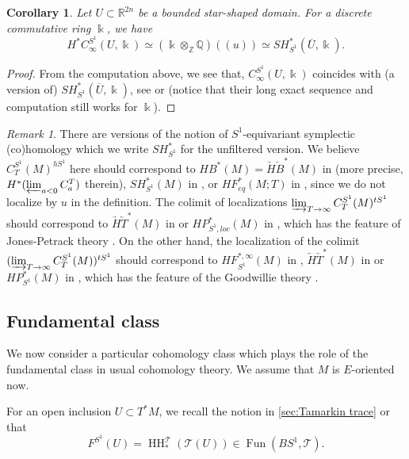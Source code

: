 \documentclass[11pt]{amsart}
\numberwithin{equation}{section}
\theoremstyle{plain}
\newtheorem{Coro}[coro]{Corollary}
\theoremstyle{definition}
\theoremstyle{remark}
\newtheorem{RMK}[rmk]{Remark}
\newcommand{\bQ} { {\mathbb{Q}}}
\newcommand{\bZ} { {\mathbb{Z}}}
\newcommand{\bR} { {\mathbb{R}}}
\newcommand{\sT} { {\mathscr{T}}}
\newcommand{\fls}[1]{{(\!(#1 )\!) }}
\newcommand\Fun{\operatorname{Fun}}
\newcommand\HH{\operatorname{HH}}
\begin{document}
\begin{Coro}
Let $U\subset \bR^{2n}$ be a bounded star-shaped domain. For a discrete commutative ring $\Bbbk$, we have
\[H^*C_\infty^{S^1}(U,\Bbbk) \simeq (\Bbbk \otimes_\bZ \bQ)\fls{u}\simeq SH_{S^1}^*(\overline{U},\Bbbk).
\]
\end{Coro}
\begin{proof}
From the computation above, we see that, $C^{S^1}_\infty(U,\Bbbk)$ coincides with (a version of) $SH^*_{S^1}(\overline{U},\Bbbk)$, see \cite[Section 4.3 and 5.1]{AlbersCieliebakFrauenfelder2016} or \cite[Section 8.1]{zhaoperiodic} (notice that their long exact sequence and computation still works for $\Bbbk$).
\end{proof}
\begin{RMK}\label{rem: versions of SH}
    There are versions of the notion of $S^1$-equivariant symplectic (co)homology which we write $SH_{S^1}^*$ for the unfiltered version. We believe $C_T^{S^1}(M)^{hS^1}$ here should correspond to $HB^*(M) = \underrightarrow{H}\underleftarrow{B}^*(M)$ in \cite[Section 4.3]{AlbersCieliebakFrauenfelder2016} (more precise, $H^*(\varprojlim_{a<0}C^T_a)$ therein), $SH^*_{S^1}(M)$ in \cite[Section 2d]{Seidel-Equivariant}, or $HF_{eq}^*(M;T)$ in \cite{Seidel2018Connections},  since we do not localize by $u$ in the definition. The colimit of localizations $\varinjlim_{T\to \infty}C_T^{S^1}(M)^{tS^1}$ should correspond to $\underrightarrow{H}\underleftarrow{T}^*(M)$ in \cite{AlbersCieliebakFrauenfelder2016} or $HP_{S^1,loc}^*(M)$ in \cite{zhaoperiodic}, which has the feature of Jones-Petrack theory \cite{JonesPetrack1990}. On the other hand, the localization of the colimit $(\varinjlim_{T\to \infty}C_T^{S^1}(M))^{tS^1}$ should correspond to $HF^{*,\infty}_{S^1}(M)$ in \cite{GanatraS1CY}, $\underleftarrow{H}\underrightarrow{T}^*(M)$ in \cite{AlbersCieliebakFrauenfelder2016} or $HP_{S^1}^*(M)$ in \cite{zhaoperiodic}, which has the feature of the Goodwillie theory \cite{Goodwillie85}.
\end{RMK}

\subsection{Fundamental class}\label{section: fundamental class}
We now consider a particular cohomology class which plays the role of the fundamental class in usual cohomology theory.  We assume that $M$ is $E$-oriented now.

For an open inclusion $U \subset T^*M$, we recall the notion in \autoref{sec:Tamarkin trace} or \cite{Capacities2021,CyclicZHANG} that 
\[ F^{S^1}(U) = \HH_*^\sT(\sT(U)) \in \Fun(BS^1, \sT).\]
\end{document}
